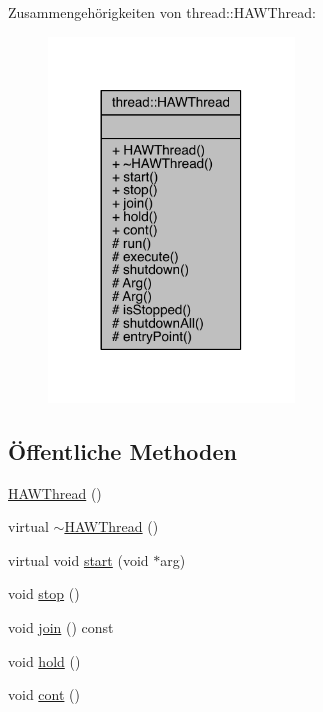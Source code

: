 Zusammengehörigkeiten von thread\+:\+:H\+A\+W\+Thread\+:
\nopagebreak
\begin{figure}[H]
\begin{center}
\leavevmode
\includegraphics[width=185pt]{classthread_1_1_h_a_w_thread__coll__graph}
\end{center}
\end{figure}
\subsection*{Öffentliche Methoden}
\begin{DoxyCompactItemize}
\item 
\hyperlink{classthread_1_1_h_a_w_thread_a7ae3280c8aee6ae6536c736a20d92e8d}{H\+A\+W\+Thread} ()
\item 
virtual \hyperlink{classthread_1_1_h_a_w_thread_a84706dda23aa384a43ced901381e795b}{$\sim$\+H\+A\+W\+Thread} ()
\item 
virtual void \hyperlink{classthread_1_1_h_a_w_thread_ae08d268c337511a1e67fbbeefcb1e89d}{start} (void $\ast$arg)
\item 
void \hyperlink{classthread_1_1_h_a_w_thread_ae8a89c83fd7e9b9a712c19f636ab2638}{stop} ()
\item 
void \hyperlink{classthread_1_1_h_a_w_thread_adbc0234a7b8eb2271a5cb4a7b8090956}{join} () const
\item 
void \hyperlink{classthread_1_1_h_a_w_thread_a18f2a0cc61833e98b18e56ea541fa38b}{hold} ()
\item 
void \hyperlink{classthread_1_1_h_a_w_thread_a4c480261e3236c90c8de73be55650ba4}{cont} ()
\end{DoxyCompactItemize}
